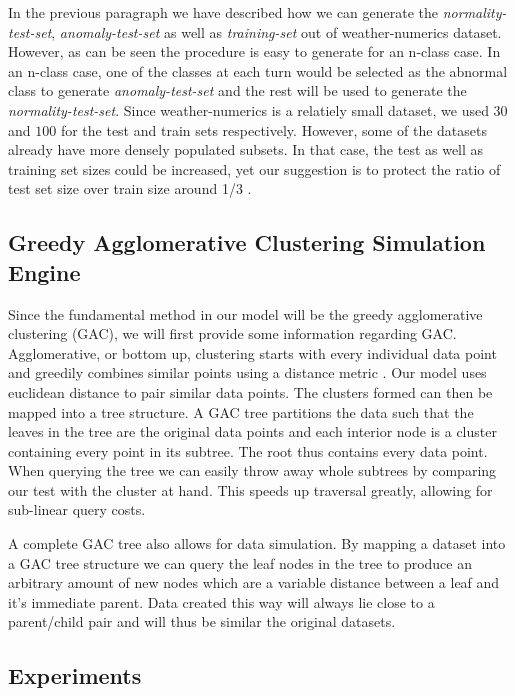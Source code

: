 \documentclass[conference]{IEEEtran}
\begin{document}
In the previous paragraph we have described how we can generate the \textit{normality-test-set}, \textit{anomaly-test-set} as well as \textit{training-set} out of weather-numerics dataset.
However, as can be seen the procedure is easy to generate for an n-class case.
In an n-class case, one of the classes at each turn would be selected as the abnormal class to generate \textit{anomaly-test-set} and the rest will be used to generate the \textit{normality-test-set}.
Since weather-numerics is a relatiely small dataset, we used $30$ and $100$ for the test and train sets respectively.
However, some of the datasets already have more densely populated subsets.
In that case, the test as well as training set sizes could be increased, yet our suggestion is to protect the ratio of test set size over train size around 1/3 .

\subsection{Greedy Agglomerative Clustering Simulation Engine}
\label{gac-simulation-engine}
Since the fundamental method in our model will be the greedy agglomerative clustering (GAC), we will first provide some information regarding GAC.
Agglomerative, or bottom up, clustering starts with every individual
data point and greedily combines similar points using a distance metric \cite{Walter}. Our
model uses euclidean distance to pair similar data points. The
clusters formed can then be mapped into a tree structure. A GAC tree
partitions the data such that the leaves in the tree are the original
data points and each interior node is a cluster containing every point
in its subtree. The root thus contains every data point.
When querying the tree we can easily throw away whole subtrees by
comparing our test with the cluster at hand. This speeds up traversal
greatly, allowing for sub-linear query costs.

A complete GAC tree also allows for data simulation.  By mapping a
dataset into a GAC tree structure we can query the leaf nodes in the
tree to produce an arbitrary amount of new nodes which are a variable
distance between a leaf and it's immediate parent.  Data created this
way will always lie close to a parent/child
pair and will thus be similar the original datasets.

\subsection{Experiments}
\end{document}
